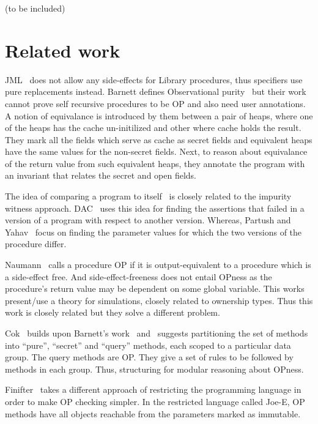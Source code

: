\documentclass{llncs}
\begin{document}
(to be included)
\section{Related work}\label{sec:related}
JML~\cite{leavens2008jml} does not allow any
side-effects for Library procedures, thus specifiers use pure
replacements instead. Barnett defines Observational
purity~\cite{barnett200499} but their work cannot prove self recursive
procedures to be OP and also need user annotations. A notion of
equivalance is introduced by them between a pair of heaps, where one
of the heaps has the cache un-initilized and other where cache holds the
result. They mark all the fields which serve as cache as secret fields
and equivalent heaps have the same values for the non-secret
fields. Next, to reason about equivalance of the return value from
such equivalent heaps, they annotate the program with an invariant
that relates the secret and open fields.

The idea of comparing a program to
itself~\cite{lahiri2013differential} \cite{partush2013abstract} is
closely related to the impurity witness
approach. DAC~\cite{lahiri2013differential} uses this idea for finding
the assertions that failed in a version of a program with respect to
another version. Whereas, Partush and Yahav~\cite{partush2013abstract}
focus on finding the parameter values for which the two versions of
the procedure differ.

Naumann~\cite{naumann2007observational} calls a procedure OP if it is
output-equivalent to a procedure which is a side-effect free. And
side-effect-freeness does not entail OPness as the procedure's return
value may be dependent on some global variable. This works present/use
a theory for simulations, closely related to ownership types. Thus
this work is closely related but they solve a different problem.

Cok~\cite{cok2008extensions} builds upon Barnett's
work~\cite{barnett2006allowing} and~\cite{barnett200499} suggests
partitioning the set of methods into ``pure'', ``secret'' and
``query'' methods, each scoped to a particular data group. The query
methods are OP. They give a set of rules to be followed by methods in
each group. Thus, structuring for modular reasoning about OPness.

Finifter~\cite{cok2008extensions} takes a different approach of
restricting the programming language in order to make OP checking
simpler. In the restricted language called Joe-E, OP methods have all
objects reachable from the parameters marked as immutable.
\end{document}
